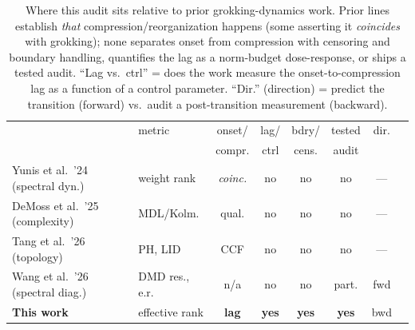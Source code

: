 \documentclass[11pt]{article}
\begin{document}
\begin{table}[!htb]
\centering
\footnotesize
\setlength{\tabcolsep}{4pt}
\caption{Where this audit sits relative to prior grokking-dynamics work. Prior lines establish
\emph{that} compression/reorganization happens (some asserting it \emph{coincides} with grokking); none
separates onset from compression with censoring and boundary handling, quantifies the lag as a
norm-budget dose-response, or ships a tested audit. ``Lag vs.\ ctrl'' = does the work measure the
onset-to-compression lag as a function of a control parameter. ``Dir.'' (direction) = predict the
transition (forward) vs.\ audit a post-transition measurement (backward).}
\label{tab:positioning}
\begin{tabular}{@{}p{}p{}cccccc@{}}
\toprule
 & metric & onset/ & lag/ & bdry/ & tested & dir. \\
 & & compr. & ctrl & cens. & audit & \\
\midrule
Yunis et al.\ '24 (spectral dyn.) & weight rank & \emph{coinc.} & no & no & no & --- \\
DeMoss et al.\ '25 (complexity) & MDL/Kolm. & qual. & no & no & no & --- \\
Tang et al.\ '26 (topology) & PH, LID & CCF & no & no & no & --- \\
Wang et al.\ '26 (spectral diag.) & DMD res., e.r. & n/a & no & no & part. & fwd \\
\textbf{This work} & effective rank & \textbf{lag} & \textbf{yes} & \textbf{yes} & \textbf{yes} & bwd \\
\bottomrule
\end{tabular}
\end{table}
\end{document}
